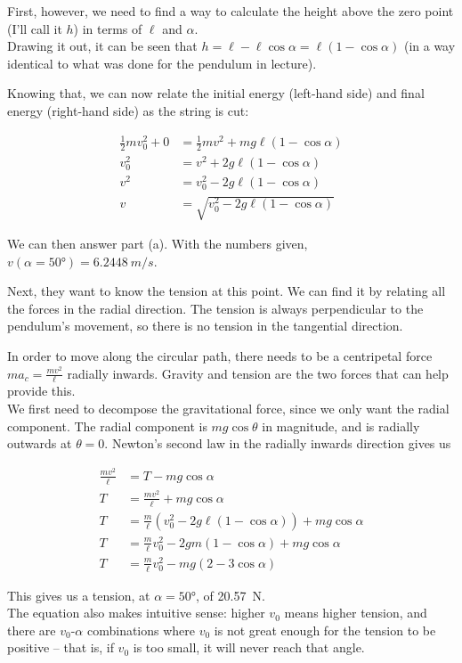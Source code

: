 \documentclass[8.01x]{subfiles}
\begin{document}
First, however, we need to find a way to calculate the height above the zero point (I'll call it $h$) in terms of $\ell$ and $\alpha$.\\
Drawing it out, it can be seen that $h = \ell - \ell \cos \alpha = \ell (1 - \cos \alpha)$ (in a way identical to what was done for the pendulum in lecture).

Knowing that, we can now relate the initial energy (left-hand side) and final energy (right-hand side) as the string is cut:

\begin{align}
\frac{1}{2} m v_0^2 + 0 &= \frac{1}{2} m v^2 + m g \ell (1 - \cos \alpha)\\
v_0^2 &= v^2 + 2 g \ell (1 - \cos \alpha)\\
v^2 &= v_0^2 - 2 g \ell (1 - \cos \alpha)\\
v &= \sqrt{v_0^2 - 2 g \ell (1 - \cos \alpha)}
\end{align}

We can then answer part (a). With the numbers given, $v(\alpha = \ang{50}) = \SI{6.2448}{m/s}$.

Next, they want to know the tension at this point. We can find it by relating all the forces in the radial direction. The tension is always perpendicular to the pendulum's movement, so there is no tension in the tangential direction.

In order to move along the circular path, there needs to be a centripetal force $\displaystyle m a_c = \frac{m v^2}{\ell}$ radially inwards. Gravity and tension are the two forces that can help provide this.\\
We first need to decompose the gravitational force, since we only want the radial component. The radial component is $m g \cos \theta$ in magnitude, and is radially outwards at $\theta = 0$. Newton's second law in the radially inwards direction gives us

\begin{align}
\frac{m v^2}{\ell} &= T - m g \cos \alpha\\
T &= \frac{m v^2}{\ell} + m g \cos \alpha\\
T &= \frac{m}{\ell}\left( v_0^2 - 2 g \ell (1 - \cos \alpha) \right) + m g \cos \alpha\\
T &= \frac{m}{\ell} v_0^2 - 2 g m (1 - \cos \alpha) + m g \cos \alpha\\
T &= \frac{m}{\ell} v_0^2 - m g (2 - 3\cos \alpha)
\end{align}

This gives us a tension, at $\alpha = \ang{50}$, of \SI{20.57}{N}.\\
The equation also makes intuitive sense: higher $v_0$ means higher tension, and there are $v_0$-$\alpha$ combinations where $v_0$ is not great enough for the tension to be positive -- that is, if $v_0$ is too small, it will never reach that angle.
\end{document}
